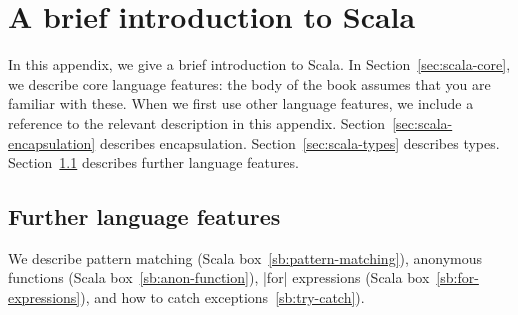 
\renewcommand{\textfraction}{.1}
\renewcommand{\topfraction}{.9}
\renewcommand{\floatpagefraction}{.75} %
\renewcommand{\bottomfraction}{0.9}
\def\floatsep{\medskipamount} %
\def\intextsep{\medskipamount} %
\def\textfloatsep{\medskipamount} %
\setcounter{topnumber}{2}

\chapter{A brief introduction to Scala}
\label{app:scala}

In this appendix, we give a brief introduction to Scala.  In
Section~\ref{sec:scala-core}, we describe core language features: the body of
the book assumes that you are familiar with these.  When we first use other
language features, we include a reference to the relevant description in this
appendix.  Section~\ref{sec:scala-encapsulation} describes encapsulation.
Section~\ref{sec:scala-types} describes types.   Section~\ref{sec:scala-misc}
describes further language features.










\pagebreak[3]

\section{Further language features}
\label{sec:scala-misc}

We describe pattern matching (Scala box~\ref{sb:pattern-matching}), anonymous
functions (Scala box~\ref{sb:anon-function}), |for| expressions (Scala
box~\ref{sb:for-expressions}), and how to catch
exceptions~\ref{sb:try-catch}). 

